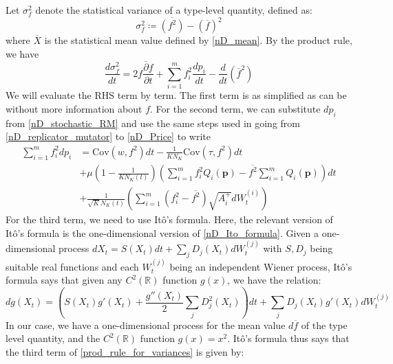 Let $\sigma^2_{f}$ denote the statistical variance of a type-level quantity, defined as:
\begin{equation}
    \sigma^2_{f} \coloneqq \overline{(f^2)} - (\overline{f})^2
\end{equation}
where $\overline{X}$ is the statistical mean value defined by \eqref{nD_mean}. By the product rule, we have
\begin{equation}
\label{prod_rule_for_variances}
\frac{d\sigma^2_{f}}{dt} = 2\overline{f\frac{\partial f}{\partial t}} + \sum\limits_{i=1}^{m}f_i^2\frac{dp_i}{dt} - \frac{d}{dt}(\overline{f}^2)
\end{equation}
We will evaluate the RHS term by term. The first term is as simplified as can be without more information about $f$. For the second term, we can substitute $dp_i$ from \eqref{nD_stochastic_RM} and use the same steps used in going from \eqref{nD_replicator_mutator} to \eqref{nD_Price} to write
\begin{equation}
\label{2nd_term_for_variances}
\begin{aligned}
\sum\limits_{i=1}^{m}f_i^2dp_i &= \textrm{Cov}(w,f^2)dt - \frac{1}{KN_K}\textrm{Cov}(\tau,f^2)dt\\
&+ \mu\left(1-\frac{1}{KN_K(t)}\right)\left(\sum\limits_{i=1}^{m}f^2_iQ_i(\mathbf{p}) - \overline{f^2}\sum\limits_{i=1}^{m}Q_i(\mathbf{p})\right)dt \\
&+\frac{1}{\sqrt{K}N_{K}(t)}\left(\sum\limits_{i=1}^{m}\left(f^2_i - \overline{f^2}\right)\sqrt{A_i^+}dW_{t}^{(i)}\right)
\end{aligned}
\end{equation}
For the third term, we need to use It\^{o}'s formula. Here, the relevant version of It\^{o}'s formula is the one-dimensional version of \eqref{nD_Ito_formula}. Given a one-dimensional process $dX_t = S(X_t)dt + \sum_j D_j(X_t)dW^{(j)}_t$ with $S, D_j$ being suitable real functions and each $W^{(j)}_t$ being an independent Wiener process, It\^{o}'s formula says that given any $C^2(\mathbb{R})$ function $g(x)$, we have the relation:
\begin{equation}
\label{1D_Ito_formula}
dg(X_t) = \left(S(X_t)g'(X_t) + \frac{g''(X_t)}{2}\sum\limits_{j}D_j^2(X_t)\right)dt + \sum\limits_{j}D_j(X_t)g'(X_t)dW^{(j)}_t 
\end{equation}
In our case, we have a one-dimensional process for the mean value $d\overline{f}$ of the type level quantity, and the $C^2(\mathbb{R})$ function $g(x) = x^2$. It\^{o}'s formula thus says that the third term of \eqref{prod_rule_for_variances} is given by:
